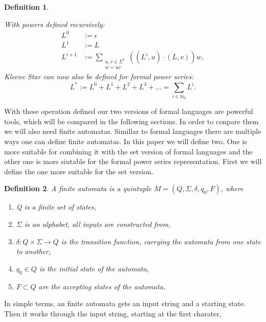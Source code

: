 \documentclass[12pt,letterpaper]{article}
\newtheorem{definition}{Definition}
\begin{document}
\begin{definition}
\begin{center}
  \end{center}
  With powers defined recursively:
  \begin{align*}
    L^0 &:= \epsilon\\
    L^1 &:= L\\
    L^{i+1} &:= \sum_{\substack{u,v \in \Sigma^* \\ w = uv}}
    ((L^i,u)\cdot (L,v))w, 
  \end{align*}
  Kleene Star can now also be defined for formal power series:
  \[
    L^* := L^0 + L^1 + L^2 + L^3 + \dots = \sum_{i \in \mathbb{N}_0} L^i.
  \]
\end{definition}
With these operation defined our two versions of formal languages are 
powerful tools, which will be compared in the following sections. In order
to conpare them we will also need finite automatas. Simillar to formal languages
there are multiple ways one can define finite automatas. In this paper we
will define two. One is more suitable for combining it with the set version
of formal languages and the other one is more siutable for the formal power
series representation. First we will define the one more suitable for the
set version.
\begin{definition}
  A finite automata is a quintuple $M = (Q, \Sigma, \delta, q_0, F)$, 
  where
  \begin{enumerate}
    \item Q is a finite set of states,
    \item $\Sigma$ is an alphabet, all inputs are constructed from,
    \item $\delta: Q \times \Sigma \to Q$ is the transition function,
      carrying the automata from one state to another,
    \item $q_0 \in Q$ is the initial state of the automata,
    \item $F \subset Q$ are the accepting states of the automata.
  \end{enumerate}
\end{definition}
In simple terms, an finite automata gets an input string and a starting 
state. Then it works through the input string, starting at the first charater,
\end{document}

